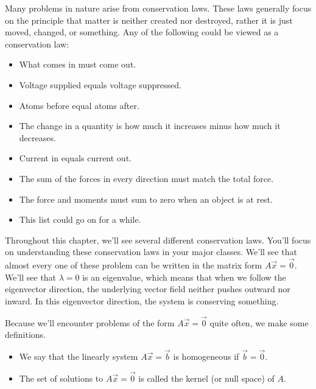Many problems in nature arise from conservation laws.  These laws generally focus on the principle that matter is neither created nor destroyed, rather it is just moved, changed, or something.  Any of the following could be viewed as a conservation law:
\begin{itemize}
 \item What comes in must come out.
 \item Voltage supplied equals voltage suppressed.
 \item Atoms before equal atoms after.
 \item The change in a quantity is how much it increases minus how much it decreases.
 \item Current in equals current out.
 \item The sum of the forces in every direction must match the total force.
 \item The force and moments must sum to zero when an object is at rest.
 \item This list could go on for a while.
\end{itemize}
Throughout this chapter, we'll see several different conservation laws.  You'll focus on understanding these conservation laws in your major classes. We'll see that almost every one of these problem can be written in the matrix form $A\vec x=\vec 0$. We'll see that $\lambda=0$ is an eigenvalue, which means that when we follow the eigenvector direction, the underlying vector field neither pushes outward nor inward. In this eigenvector direction, the system is conserving something.
\begin{definition}\label{homogeneous and kernel of a matrix}
Because we'll encounter problems of the form $A\vec x = \vec 0$ quite often, we make some definitions. 
\begin{itemize}
 \item We say that the linearly system $A\vec x=\vec b$ is homogeneous if $\vec b=\vec 0$. 
 \item The set of solutions to $A\vec x=\vec 0$ is called the kernel (or null space) of $A$.  
\end{itemize}
\end{definition}




